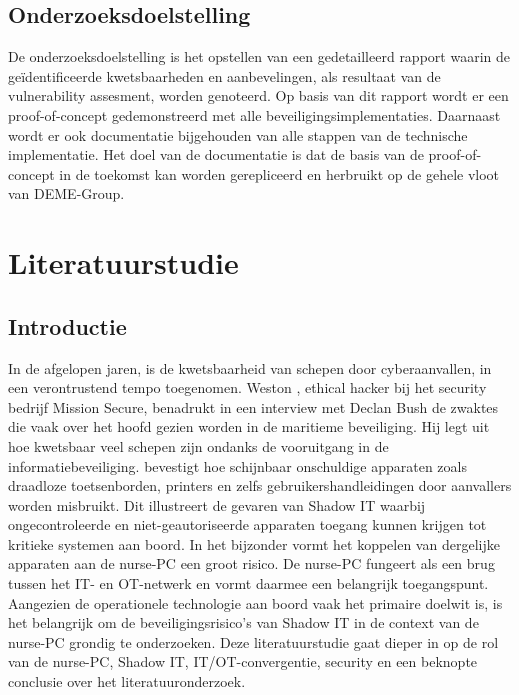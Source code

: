 \subsection{Onderzoeksdoelstelling}
De onderzoeksdoelstelling is het opstellen van een gedetailleerd rapport waarin de geïdentificeerde kwetsbaarheden en aanbevelingen, als resultaat van de vulnerability assesment, worden genoteerd.
Op basis van dit rapport wordt er een proof-of-concept gedemonstreerd met alle beveiligingsimplementaties.
Daarnaast wordt er ook documentatie bijgehouden van alle stappen van de technische implementatie.
Het doel van de documentatie is dat de basis van de proof-of-concept in de toekomst kan worden gerepliceerd en herbruikt op de gehele vloot van DEME-Group.



\section{Literatuurstudie}%
\label{sec:literatuurstudie}
\subsection{Introductie}
In de afgelopen jaren, is de kwetsbaarheid van schepen door cyberaanvallen, in een verontrustend tempo toegenomen. Weston \textcite{Hecker2021}, ethical hacker bij het security bedrijf 
Mission Secure, benadrukt in een interview met Declan Bush de zwaktes die vaak over het hoofd gezien worden in de maritieme beveiliging. Hij
legt uit hoe kwetsbaar veel schepen zijn ondanks de vooruitgang in de informatiebeveiliging. \textcite{Hecker2021} bevestigt hoe schijnbaar onschuldige apparaten zoals draadloze toetsenborden, printers en 
zelfs gebruikershandleidingen door aanvallers worden misbruikt. Dit illustreert de gevaren van Shadow IT waarbij ongecontroleerde en niet-geautoriseerde apparaten toegang kunnen krijgen tot kritieke systemen aan boord. 
In het bijzonder vormt het koppelen van dergelijke apparaten aan de nurse-PC een groot risico. De nurse-PC fungeert als een brug tussen het IT- en OT-netwerk en vormt daarmee een belangrijk toegangspunt. 
Aangezien de operationele technologie aan boord vaak het primaire doelwit is, is het belangrijk om de beveiligingsrisico's van Shadow IT in de context van de nurse-PC grondig te onderzoeken.
Deze literatuurstudie gaat dieper in op de rol van de nurse-PC, Shadow IT, IT/OT-convergentie, security en een beknopte conclusie over het literatuuronderzoek.

